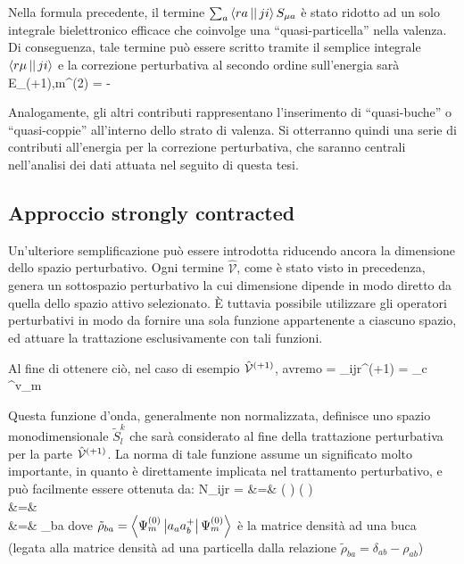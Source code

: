 Nella formula precedente, il termine $\sum_{a} \left\langle ra \left| \right| ji \right\rangle S_{\mu a}$ \`e stato ridotto
ad un solo integrale bielettronico efficace che coinvolge una ``quasi-particella'' nella valenza.
Di conseguenza, tale termine pu\`o essere scritto tramite il semplice integrale
$\left\langle r\mu \left| \right| ji \right\rangle$ e la correzione perturbativa al secondo ordine 
sull'energia sar\`a
\beq
E_{(+1),m}^{(2)} = -   \sumidx{\mu}
\eeq

Analogamente, gli altri contributi rappresentano l'inserimento di
``quasi-buche'' o ``quasi-coppie'' all'interno dello strato di valenza.
Si otterranno quindi una serie di contributi all'energia per la correzione
perturbativa, che saranno centrali nell'analisi dei dati attuata nel
seguito di questa tesi.

\subsection{Approccio strongly contracted}

Un'ulteriore semplificazione pu\`o essere introdotta riducendo ancora la 
dimensione dello spazio perturbativo. Ogni termine $\hat{\mathcal{V}}$,
come \`e stato visto in precedenza, genera un sottospazio perturbativo la
cui dimensione dipende in modo diretto da quella dello spazio attivo
selezionato. \`E tuttavia possibile utilizzare gli operatori perturbativi in
modo da fornire una sola funzione appartenente a ciascuno
spazio, ed attuare la trattazione esclusivamente con tali funzioni.

Al fine di ottenere ci\`o, nel caso di esempio $\hat{\mathcal{V}}^{(+1)}$, avremo
\beq
{} = \perturb_{ijr}^{(+1)}  = 
  \Phi_c  
\Psi^{v}_{m}
\eeq

Questa funzione d'onda, generalmente non normalizzata, definisce uno spazio
monodimensionale $\tilde{S}_l^k$ che sar\`a considerato al fine della
trattazione perturbativa per la parte $\hat{\mathcal{V}}^{(+1)}$.
La norma di tale funzione assume un significato molto importante, in quanto
\`e direttamente implicata nel trattamento perturbativo, e pu\`o facilmente
essere ottenuta da:
\beqa
N_{ijr} =  &=& \left(  
 \right) \left(  
 \right) \nonumber \\
&=&     \nonumber \\
&=&   \tilde{\rho}_{ba} 
\eeqa
dove $\tilde{\rho}_{ba} =
\left\langle \Psi_m^{(0)} \left| a_{a}a_{b}^{+} \right| \Psi_m^{(0)} \right\rangle$ \`e la matrice
densit\`a ad una buca (legata alla matrice densit\`a ad una particella dalla
relazione $\tilde{\rho}_{ba} = \delta_{ab} - \rho_{ab}$)

